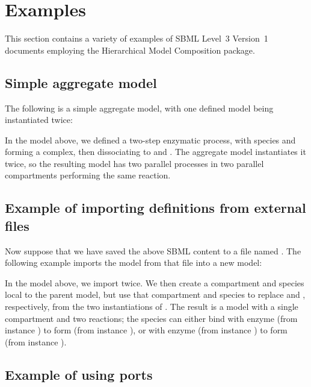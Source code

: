 
\section{Examples}
\label{examples}

This section contains a variety of examples of SBML Level~3 Version~1
documents employing the Hierarchical Model Composition package.

\subsection{Simple aggregate model}

The following is a simple aggregate model, with one defined model being
instantiated twice:


In the model above, we defined a two-step enzymatic process, with
species  and  forming a complex, then dissociating to
 and .  The aggregate model instantiates it twice, so the
resulting model  has two parallel processes in two
parallel compartments performing the same reaction.


\subsection{Example of importing definitions from external files}

Now suppose that we have saved the above SBML content to a file named
.  The following example imports the model
 from that file into a new model:


In the model above, we import  twice.  We then create a
compartment and species local to the parent model, but use that
compartment and species to replace  and , respectively,
from the two instantiations of .  The result is a model with
a single compartment and two reactions; the species  can either
bind with enzyme  (from instance ) to form  (from
instance ), or with enzyme  (from instance ) to
form  (from instance ).


\subsection{Example of using ports}

